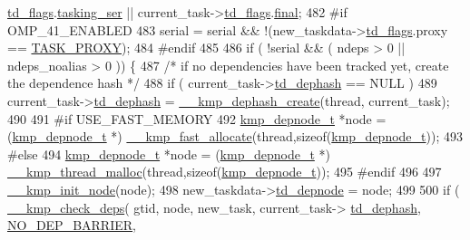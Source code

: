 \begin{DoxyCode}
{      \hyperlink{structkmp__taskdata_aa6380b6723d2482345a1e6cffcd15e9f}{td\_flags}.\hyperlink{structkmp__tasking__flags_a68f882661553dde50d4ccc2e472e9f05}{tasking\_ser} || current\_task->\hyperlink{structkmp__taskdata_aa6380b6723d2482345a1e6cffcd15e9f}{td\_flags}.\hyperlink{structkmp__tasking__flags_adc49b76236bc45b6c68457f8e81230b7}{final};
482 \textcolor{preprocessor}{#if OMP\_41\_ENABLED}
483 \textcolor{preprocessor}{}    serial = serial && !(new\_taskdata->\hyperlink{structkmp__taskdata_aa6380b6723d2482345a1e6cffcd15e9f}{td\_flags}.proxy == \hyperlink{kmp_8h_a09ec98eec6915a3858e6146869f27a50}{TASK\_PROXY});
484 \textcolor{preprocessor}{#endif}
485 \textcolor{preprocessor}{}
486     \textcolor{keywordflow}{if} ( !serial && ( ndeps > 0 || ndeps\_noalias > 0 )) \{
487         \textcolor{comment}{/* if no dependencies have been tracked yet, create the dependence hash */}
488         \textcolor{keywordflow}{if} ( current\_task->\hyperlink{structkmp__taskdata_a428a82593aa88b9d2420390cdee239d8}{td\_dephash} == NULL )
489             current\_task->\hyperlink{structkmp__taskdata_a428a82593aa88b9d2420390cdee239d8}{td\_dephash} = \hyperlink{kmp__taskdeps_8cpp_a0d86f5a20b0781cca078b6a2c4d6ba53}{\_\_kmp\_dephash\_create}(thread, 
      current\_task);
490 
491 \textcolor{preprocessor}{#if USE\_FAST\_MEMORY}
492 \textcolor{preprocessor}{}        \hyperlink{unionkmp__depnode}{kmp\_depnode\_t} *node = (\hyperlink{unionkmp__depnode}{kmp\_depnode\_t} *) 
      \hyperlink{kmp_8h_a2adbf8a689a0e42c899bde3d997ac1c0}{\_\_kmp\_fast\_allocate}(thread,\textcolor{keyword}{sizeof}(\hyperlink{unionkmp__depnode}{kmp\_depnode\_t}));
493 \textcolor{preprocessor}{#else}
494 \textcolor{preprocessor}{}        \hyperlink{unionkmp__depnode}{kmp\_depnode\_t} *node = (\hyperlink{unionkmp__depnode}{kmp\_depnode\_t} *) 
      \hyperlink{kmp_8h_a83a0d4c2333a2ee3931cba6b12e0d5a6}{\_\_kmp\_thread\_malloc}(thread,\textcolor{keyword}{sizeof}(\hyperlink{unionkmp__depnode}{kmp\_depnode\_t}));
495 \textcolor{preprocessor}{#endif}
496 \textcolor{preprocessor}{}
497         \hyperlink{kmp__taskdeps_8cpp_a071ab81c9fcbb82f0d78b38e814a5cbb}{\_\_kmp\_init\_node}(node);
498         new\_taskdata->\hyperlink{structkmp__taskdata_a877878bd557ba3bdc7749e531cb845b3}{td\_depnode} = node;
499 
500         \textcolor{keywordflow}{if} ( \hyperlink{kmp__taskdeps_8cpp_aa9a60ae78b4c85746fef2074b08dbb65}{\_\_kmp\_check\_deps}( gtid, node, new\_task, current\_task->
      \hyperlink{structkmp__taskdata_a428a82593aa88b9d2420390cdee239d8}{td\_dephash}, \hyperlink{kmp__taskdeps_8cpp_aa585999671d92d06e72ff64b02d7741b}{NO\_DEP\_BARRIER},
}
\end{DoxyCode}
